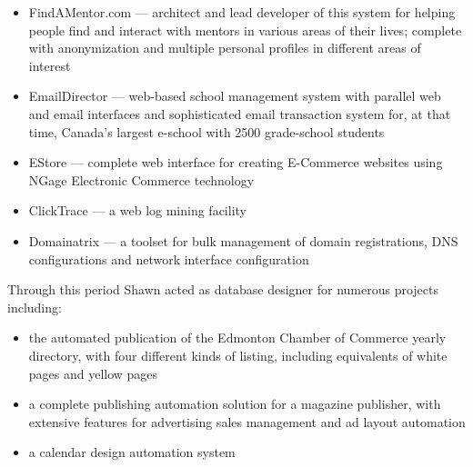 \begin{resume}
\begin{position}
\begin{itemize}
\item FindAMentor.com --- architect and lead developer of this system
                    for helping people find and interact with mentors in
		    various areas of their lives; complete with anonymization and
		    multiple personal profiles in different areas of interest
\item EmailDirector --- web-based school management system with
                        parallel web and email interfaces
                        and sophisticated email transaction system for,
                        at that time, Canada's largest e-school
                        with 2500 grade-school students
\item EStore --- complete web interface for creating E-Commerce
                 websites using NGage Electronic Commerce technology
\item ClickTrace --- a web log mining facility
\item Domainatrix --- a toolset for bulk management of domain registrations, 
                      DNS configurations and network interface
                      configuration
\end{itemize}

Through this period Shawn acted as database designer for numerous projects including:
\begin{itemize}
\item the automated publication of the Edmonton Chamber of Commerce
  yearly directory, with four different kinds of listing, including equivalents of white pages and yellow pages
\item a complete publishing automation solution for a magazine publisher, with extensive features 
for advertising sales management and ad layout automation
\item a calendar design automation system


\end{itemize}

\end{position}




\end{resume}
